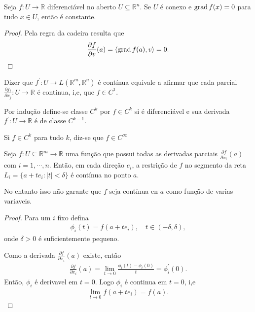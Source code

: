 \begin{corollary}
  Seja $f:U\to\mathbb{R}$ diferenciável no aberto $U\subseteq \mathbb{R}^{n}$. Se $U$ é conexo e $\operatorname{grad} f(x)=0$ para tudo $x\in U$, então é constante. 
\end{corollary}
\begin{proof} 
  Pela regra da cadeira resulta que
  \begin{align*}
    \frac{\partial f}{\partial v}(a)=\langle \operatorname{grad} f(a),v\rangle=0.
  \end{align*}
\end{proof}
\begin{definition}[Classe $C^{k}$]
  Dizer que $f^{\prime}:U\to L(\mathbb{R}^{m},\mathbb{R}^{n})$ é contínua equivale a afirmar que cada parcial $\frac{\partial f_i}{\partial x_j}:U\to\mathbb{R}$ é continua, i,e, que $f\in C^{1}$.

  Por indução define-se classe $C^{k}$ por $f\in C^{k}$ si é diferenciável e sua derivada $f^{\prime}:U\to\mathbb{R}$ é de classe $C^{k-1}$.

  Si $f\in C^{k}$ para tudo $k$, diz-se que $f\in C^{\infty}$
\end{definition}
\begin{proposition}
  Seja $f:U\subseteq\mathbb{R}^{m}\to\mathbb{R}$ uma função que possui todas as derivadas parciais $\frac{\partial f}{\partial x_i}(a)$ com $i=1,\cdots,n$. Então, em cada direção $e_i$, a restrição de $f$ no segmento da reta $L_i=\{a+te_i:|t|<\delta\}$ é contínua no ponto $a$.

  No entanto isso não garante que $f$ seja contínua en $a$ como função de varias variaveis. 
\end{proposition}
\begin{proof} 
  Para um $i$ fixo defina
  \begin{align*}
    \phi_i(t)=f(a+te_i),\quad t\in(-\delta,\delta),
  \end{align*}
  onde $\delta>0$ é suficientemente pequeno.

  Como a derivada $\frac{\partial f}{\partial x_i}(a)$ existe, então
  \begin{align*}
    \frac{\partial f}{\partial x_i}(a)=\lim_{t \to 0}\frac{\phi_i(t)-\phi_i(0)}{t}=\phi_i^{\prime}(0).
  \end{align*}
  Então, $\phi_i$ é derivavel em $t=0$. Logo $\phi_i$ é continua em $t=0$, i,e
  \begin{align*}
    \lim_{t \to 0}f(a+te_i)=f(a).
  \end{align*}
\end{proof}
